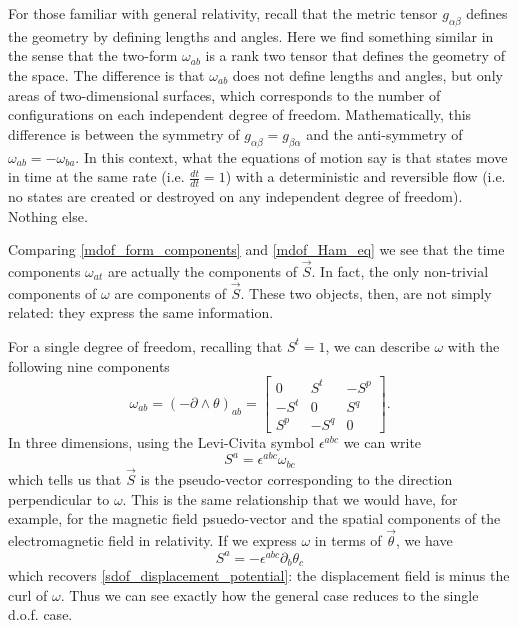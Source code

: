 \documentclass[fleqn,10pt]{wlscirep}
\begin{document}
For those familiar with general relativity, recall that the metric tensor $g_{\alpha\beta}$ defines the geometry by defining lengths and angles. Here we find something similar in the sense that the two-form $\omega_{ab}$ is a rank two tensor that defines the geometry of the space. The difference is that $\omega_{ab}$ does not define lengths and angles, but only areas of two-dimensional surfaces, which corresponds to the number of configurations on each independent degree of freedom. Mathematically, this difference is between the symmetry of $g_{\alpha\beta} = g_{\beta\alpha}$ and the anti-symmetry of $\omega_{ab} = -\omega_{ba}$. In this context, what the equations of motion say is that states move in time at the same rate (i.e. $\frac{dt}{dt} = 1$) with a deterministic and reversible flow (i.e. no states are created or destroyed on any independent degree of freedom). Nothing else.

Comparing \ref{mdof_form_components} and \ref{mdof_Ham_eq} we see that the time components $\omega_{at}$ are actually the components of $\vec{S}$. In fact, the only non-trivial components of $\omega$ are components of $\vec{S}$. These two objects, then, are not simply related: they express the same information.

For a single degree of freedom, recalling that $S^t = 1$, we can describe $\omega$ with the following nine components
\begin{equation}\label{mdof_reduceto_sdof}
	\omega_{ab}=(-\partial \wedge\theta)_{ab} = \begin{bmatrix}
		0 & S^t & -S^p \\
		-S^t & 0 & S^q \\
		S^p & - S^q & 0
	\end{bmatrix}.
\end{equation}
In three dimensions, using the Levi-Civita symbol $\epsilon^{abc}$ we can write
\begin{equation}
	S^a = \epsilon^{abc} \omega_{bc}
\end{equation}
which tells us that $\vec{S}$ is the pseudo-vector corresponding to the direction perpendicular to $\omega$. This is the same relationship that we would have, for example, for the magnetic field psuedo-vector and the spatial components of the electromagnetic field in relativity. If we express $\omega$ in terms of $\vec{\theta}$, we have
\begin{equation}
	S^a = - \epsilon^{abc} \partial_b \theta_c
\end{equation}
which recovers \ref{sdof_displacement_potential}: the displacement field is minus the curl of $\omega$. Thus we can see exactly how the general case reduces to the single d.o.f. case.
\end{document}
